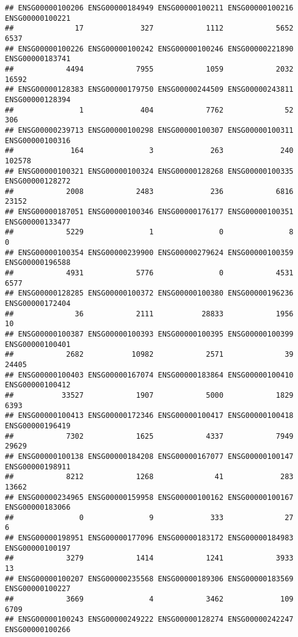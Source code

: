 \documentclass[
]{article}
\begin{document}
\begin{verbatim}
## ENSG00000100206 ENSG00000184949 ENSG00000100211 ENSG00000100216 ENSG00000100221 
##              17             327            1112            5652            6537 
## ENSG00000100226 ENSG00000100242 ENSG00000100246 ENSG00000221890 ENSG00000183741 
##            4494            7955            1059            2032           16592 
## ENSG00000128383 ENSG00000179750 ENSG00000244509 ENSG00000243811 ENSG00000128394 
##               1             404            7762              52             306 
## ENSG00000239713 ENSG00000100298 ENSG00000100307 ENSG00000100311 ENSG00000100316 
##             164               3             263             240          102578 
## ENSG00000100321 ENSG00000100324 ENSG00000128268 ENSG00000100335 ENSG00000128272 
##            2008            2483             236            6816           23152 
## ENSG00000187051 ENSG00000100346 ENSG00000176177 ENSG00000100351 ENSG00000133477 
##            5229               1               0               8               0 
## ENSG00000100354 ENSG00000239900 ENSG00000279624 ENSG00000100359 ENSG00000196588 
##            4931            5776               0            4531            6577 
## ENSG00000128285 ENSG00000100372 ENSG00000100380 ENSG00000196236 ENSG00000172404 
##              36            2111           28833            1956              10 
## ENSG00000100387 ENSG00000100393 ENSG00000100395 ENSG00000100399 ENSG00000100401 
##            2682           10982            2571              39           24405 
## ENSG00000100403 ENSG00000167074 ENSG00000183864 ENSG00000100410 ENSG00000100412 
##           33527            1907            5000            1829            6393 
## ENSG00000100413 ENSG00000172346 ENSG00000100417 ENSG00000100418 ENSG00000196419 
##            7302            1625            4337            7949           29629 
## ENSG00000100138 ENSG00000184208 ENSG00000167077 ENSG00000100147 ENSG00000198911 
##            8212            1268              41             283           13662 
## ENSG00000234965 ENSG00000159958 ENSG00000100162 ENSG00000100167 ENSG00000183066 
##               0               9             333              27               6 
## ENSG00000198951 ENSG00000177096 ENSG00000183172 ENSG00000184983 ENSG00000100197 
##            3279            1414            1241            3933              13 
## ENSG00000100207 ENSG00000235568 ENSG00000189306 ENSG00000183569 ENSG00000100227 
##            3669               4            3462             109            6709 
## ENSG00000100243 ENSG00000249222 ENSG00000128274 ENSG00000242247 ENSG00000100266 

\end{verbatim}
\end{document}
